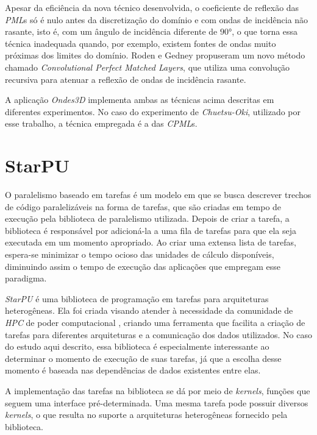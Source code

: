 \documentclass[cic,tc]{iiufrgs}
\begin{document}
Apesar da eficiência da nova técnico desenvolvida, o coeficiente de reflexão das \textit{PML}s só é nulo antes da discretização do domínio e com ondas de incidência não rasante,
isto é, com um ângulo de incidência diferente de $90$°, o que torna essa técnica inadequada quando, por exemplo, existem fontes de ondas muito próximas dos limites do domínio. Roden e
Gedney \cite{CPML} propuseram um novo método chamado \textit{Convolutional Perfect Matched Layers}, que utiliza uma convolução recursiva para atenuar a reflexão de ondas de incidência rasante.

A aplicação \textit{Ondes3D} implementa ambas as técnicas acima descritas em diferentes experimentos. No caso do experimento de \textit{Chuetsu-Oki}, utilizado por esse trabalho, a técnica
empregada é a das \textit{CPML}s.


\section{StarPU}

O paralelismo baseado em tarefas é um modelo em que se busca descrever trechos de código paralelizáveis na forma de tarefas, que são criadas em tempo de execução pela biblioteca de
paralelismo utilizada. Depois de criar a tarefa, a biblioteca é responsável por adicioná-la a uma fila de tarefas para que ela seja executada em um momento apropriado. Ao criar uma
extensa lista de tarefas, espera-se minimizar o tempo ocioso das unidades de cálculo disponíveis, diminuindo assim o tempo de execução das aplicações que empregam esse paradigma.

\textit{StarPU} é uma biblioteca de programação em tarefas para arquiteturas heterogêneas. Ela foi criada visando atender à necessidade da comunidade de \textit{HPC} de
poder computacional \cite{StarPU}, criando uma ferramenta que facilita a criação de tarefas para diferentes arquiteturas e a comunicação dos dados utilizados. No caso do estudo aqui
descrito, essa biblioteca é especialmente interessante ao determinar o momento de execução de suas tarefas, já que a escolha desse momento é baseada nas dependências de dados
existentes entre elas.

A implementação das tarefas na biblioteca se dá por meio de \textit{kernels}, funções que seguem uma interface pré-determinada. Uma mesma tarefa pode possuir diversos
\textit{kernels}, o que resulta no suporte a arquiteturas heterogêneas fornecido pela biblioteca.

\end{document}
